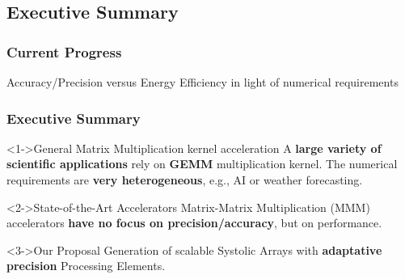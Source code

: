 \graphicspath{{../../../PhD/paper_factory/thesis_louis/Chapter4/Figs/}{../../../PhD/paper_factory/thesis_louis/Chapter3/Figs/}}
\subsection{Executive Summary}
\begin{frame}
    \frametitle{Current Progress}

    \centering
    \huge Accuracy/Precision versus Energy Efficiency in light of numerical requirements
    \normalsize

    \vspace{1em} %

    \tableofcontents[currentsection,
                     subsectionstyle=show/shaded/hide,
                     sectionstyle=show/hide]

\end{frame}

\begin{frame}
    \frametitle{Executive Summary}
        \begin{alertblock}<1->{General Matrix Multiplication kernel acceleration}
		A \textbf{large variety of scientific applications} rely on \textbf{GEMM} multiplication kernel. The numerical requirements are \textbf{very heterogeneous}, e.g., AI or weather forecasting.
        \end{alertblock}

        \begin{exampleblock}<2->{State-of-the-Art Accelerators}
		Matrix-Matrix Multiplication (MMM) accelerators \textbf{have no focus on precision/accuracy}, but on performance.
        \end{exampleblock}

        \begin{block}<3->{Our Proposal}
		Generation of scalable Systolic Arrays with \textbf{adaptative precision} Processing Elements.
        \end{block}
\end{frame}


